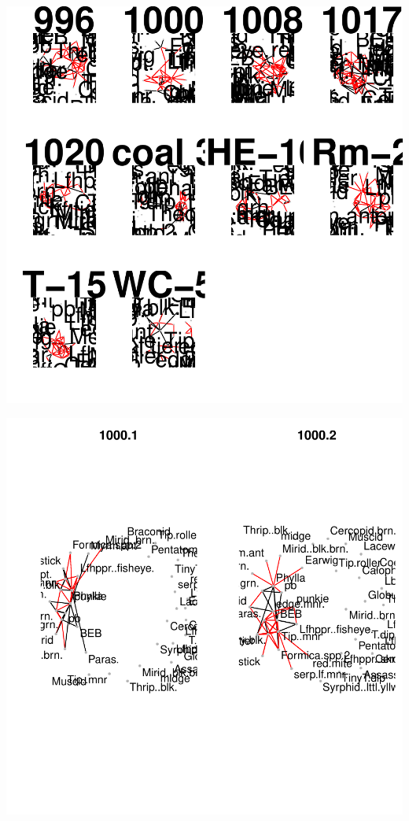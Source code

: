 \documentclass[12pt]{article}
\begin{document}
\includegraphics{pb_removal-008}

\begin{landscape}
  

\includegraphics{pb_removal-009}

\end{landscape}
\end{document}
